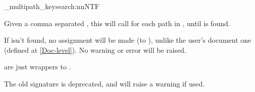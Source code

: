 \documentclass[10pt]{article}
\begin{document}
\begin{codedescribe}[code,update=2025/05/26]{\pgfkeysearch_multipath_keysearch:nnNTF}
\begin{codesyntax}%
\end{codesyntax}
Given a comma separated , this will call   for each path in , until  is found.
\end{codedescribe}

\begin{tsremark}
  If  isn't found, no assignment will be made (to ), unlike the user's document one (defined at \ref{Doc-level}). No warning or error will be raised.
\end{tsremark}
\begin{tsremark}
  \tsobj[code]{\pgfkeysearchvalueof,\pgfkeysearch,\pgfkeysearchvalueofTF,\pgfkeysearchTF} are just wrappers to .
\end{tsremark}
\begin{tsremark}
  The old signature  is deprecated, and will raise a warning if used.
\end{tsremark}
\end{document}
